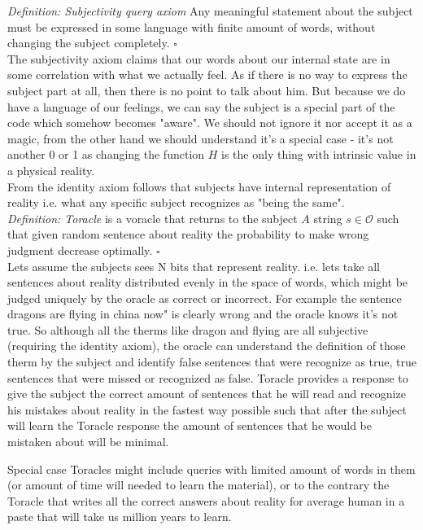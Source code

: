 \documentclass{article}
\begin{document}
\textit{Definition: Subjectivity query axiom} Any meaningful statement about the subject must be expressed in some language with finite amount of words, without changing the subject completely. $\square$\\

The subjectivity axiom claims that our words about our internal state are in some correlation with what we actually feel. As if there is no way to express the subject part at all, then there is no point to talk about him. But because we do have a language of our feelings, we can say the subject is a special part of the code which somehow becomes "aware". We should not ignore it nor accept it as a magic, from the other hand we should understand it's a special case - it's not another 0 or 1 as changing the function $H$ is the only thing with intrinsic value in a physical reality. \\

From the identity axiom follows that subjects have internal representation of reality i.e. what any specific subject recognizes as "being the same".\\

\textit{Definition: Toracle} is a voracle that returns to the subject $A$ string  $s \in \mathcal{O}$ such that given random sentence about reality the probability to make wrong judgment decrease optimally. $\square$ \\

Lets assume the subjects sees N bits that represent reality. i.e. lets take all sentences about reality distributed evenly in the space of words, which might be judged uniquely by the oracle as correct or incorrect. For example the sentence dragons are flying in china now" is clearly wrong and the oracle knows it's not true. So although all the therms like dragon and flying are all subjective (requiring the identity axiom), the oracle can understand the definition of those therm by the subject and identify false sentences that were recognize as true, true sentences that were missed or recognized as false. Toracle provides a response to give the subject the correct amount of sentences that he will read and recognize his mistakes about reality in the fastest way possible such that after the subject will learn the Toracle response the amount of sentences that he would be mistaken about will be minimal. 

Special case Toracles might include queries with limited amount of words in them (or amount of time will needed to learn the material), or to the contrary the Toracle that writes all the correct answers about reality for average human in a paste that will take us million years to learn. 
\end{document}
